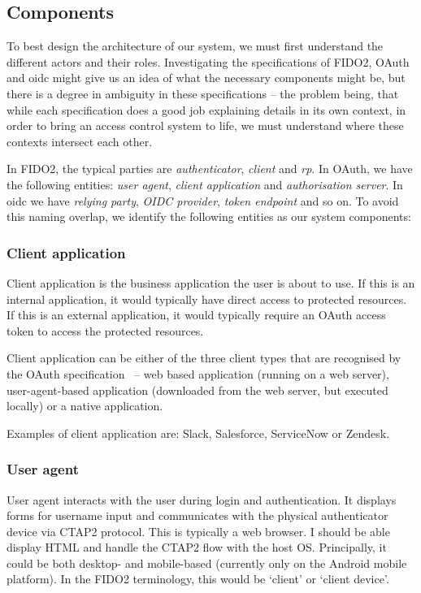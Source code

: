 \subsection{Components}
To best design the architecture of our system, we must first understand the different actors and their roles. Investigating the specifications of FIDO2, OAuth and \acrshort{oidc} might give us an idea of what the necessary components might be, but there is a degree in ambiguity in these specifications -- the problem being, that while each specification does a good job explaining details in its own context, in order to bring an access control system to life, we must understand where these contexts intersect each other.

In FIDO2, the typical parties are \textit{authenticator}, \textit{client} and \textit{\acrshort{rp}}. In OAuth, we have the following entities: \textit{user agent}, \textit{client application} and \textit{authorisation server}. In \acrshort{oidc} we have \textit{relying party}, \textit{OIDC provider}, \textit{token endpoint} and so on. To avoid this naming overlap, we identify the following entities as our system components:
% 

\subsubsection{Client application} 
Client application is the business application the user is about to use. If this is an internal application, it would typically have direct access to protected resources. If this is an external application, it would typically require an OAuth access token to access the protected resources.
    
Client application can be either of the three client types that are recognised by the OAuth specification~\cite{Hardt2012TheFramework} -- web based application (running on a web server), user-agent-based application (downloaded from the web server, but executed locally) or a native application.
    
Examples of client application are: Slack, Salesforce, ServiceNow or Zendesk.

\subsubsection{User agent}
User agent interacts with the user during login and authentication. It displays forms for username input and communicates with the physical authenticator device via CTAP2 protocol. This is typically a web browser. I should be able display HTML and handle the CTAP2 flow with the host OS. Principally, it could be both desktop- and mobile-based (currently only on the Android mobile platform). In the FIDO2 terminology, this would be `client' or `client device'.
    
